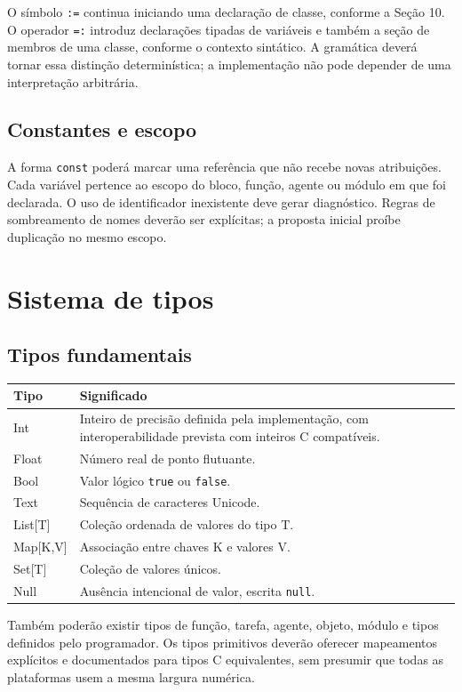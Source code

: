 \documentclass[12pt,a4paper]{article}
\begin{document}
O símbolo \texttt{:=} continua iniciando uma declaração de classe, conforme a Seção 10. O operador \texttt{=:} introduz declarações tipadas de variáveis e também a seção de membros de uma classe, conforme o contexto sintático. A gramática deverá tornar essa distinção determinística; a implementação não pode depender de uma interpretação arbitrária.

\subsection{Constantes e escopo}
A forma \texttt{const} poderá marcar uma referência que não recebe novas atribuições. Cada variável pertence ao escopo do bloco, função, agente ou módulo em que foi declarada. O uso de identificador inexistente deve gerar diagnóstico. Regras de sombreamento de nomes deverão ser explícitas; a proposta inicial proíbe duplicação no mesmo escopo.

\section{Sistema de tipos}
\subsection{Tipos fundamentais}
\begin{center}
\begin{tabular}{>{\ttfamily}p{3cm}p{10cm}}
\textnormal{\textbf{Tipo}} & \textnormal{\textbf{Significado}}\\
\hline
Int & Inteiro de precisão definida pela implementação, com interoperabilidade prevista com inteiros C compatíveis.\\
Float & Número real de ponto flutuante.\\
Bool & Valor lógico \texttt{true} ou \texttt{false}.\\
Text & Sequência de caracteres Unicode.\\
List[T] & Coleção ordenada de valores do tipo T.\\
Map[K,V] & Associação entre chaves K e valores V.\\
Set[T] & Coleção de valores únicos.\\
Null & Ausência intencional de valor, escrita \texttt{null}.\\
\end{tabular}
\end{center}

Também poderão existir tipos de função, tarefa, agente, objeto, módulo e tipos definidos pelo programador. Os tipos primitivos deverão oferecer mapeamentos explícitos e documentados para tipos C equivalentes, sem presumir que todas as plataformas usem a mesma largura numérica.
\end{document}
